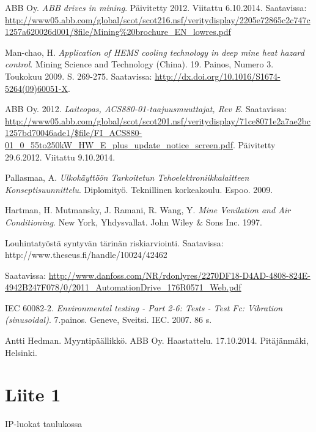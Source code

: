 \documentclass[finnish,12pt,a4paper,pdftex,elec,utf8]{aaltothesis}
\begin{document}
\begin{thebibliography}{99}
ABB Oy. \textit{ABB drives in mining}. Päivitetty 2012. Viitattu 6.10.2014. Saatavissa: \url{http://www05.abb.com/global/scot/scot216.nsf/veritydisplay/2205e72865c2c747c1257a620026d001/$file/Mining%20brochure_EN_lowres.pdf}

Man-chao, H. \textit{Application of HEMS cooling technology in deep mine heat hazard control}. Mining Science and Technology (China). 19. Painos, Numero 3. Toukokuu 2009. S. 269-275. Saatavissa: \url{http://dx.doi.org/10.1016/S1674-5264(09)60051-X}.

ABB Oy. 2012. \textit{Laiteopas, ACS880-01-taajuusmuuttajat, Rev E}. Saatavissa: \url{http://www05.abb.com/global/scot/scot201.nsf/veritydisplay/71ce8071e2a7ae2bc1257bd70046ade1/$file/FI_ACS880-01_0_55to250kW_HW_E_plus_update_notice_screen.pdf}. Päivitetty 29.6.2012. Viitattu 9.10.2014.

Pallasmaa, A. \textit{Ulkokäyttöön Tarkoitetun Tehoelektroniikkalaitteen Konseptisuunnittelu}. Diplomityö. Teknillinen korkeakoulu. Espoo. 2009.

Hartman, H. Mutmansky, J. Ramani, R. Wang, Y. \textit{Mine Venilation and Air Conditioning}. New York, Yhdysvallat. John Wiley \& Sons Inc. 1997.

Louhintatyöstä syntyvän tärinän riskiarviointi. Saatavissa: http://www.theseus.fi/handle/10024/42462

 Saatavissa: \url{http://www.danfoss.com/NR/rdonlyres/2270DF18-D4AD-4808-824E-4942B247F078/0/2011_AutomationDrive_176R0571_Web.pdf}

IEC 60082-2. \textit{Environmental testing - Part 2-6: Tests - Test Fc: Vibration (sinusoidal)}. 7.painos. Geneve, Sveitsi. IEC. 2007. 86 s.

Antti Hedman. Myyntipäällikkö. ABB Oy. Haastattelu. 17.10.2014. Pitäjänmäki, Helsinki.

\end{thebibliography}



\clearpage

\thesisappendix
\section{Liite 1\label{LiiteA}}
IP-luokat taulukossa
\end{document}
